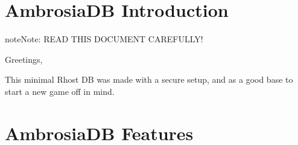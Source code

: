 \documentclass[letterpaper,10pt,english]{sphinxmanual}
\begin{document}
\section{AmbrosiaDB Introduction}
\label{\detokenize{ambrosiadb:ambrosiadb-introduction}}
\begin{sphinxadmonition}{note}{Note:}
\sphinxAtStartPar
READ THIS DOCUMENT CAREFULLY!
\end{sphinxadmonition}

\sphinxAtStartPar
Greetings,

\sphinxAtStartPar
This minimal Rhost DB was made with a secure setup, and as a good base to start
a new game off in mind.


\section{AmbrosiaDB Features}
\label{\detokenize{ambrosiadb:ambrosiadb-features}}
\end{document}
